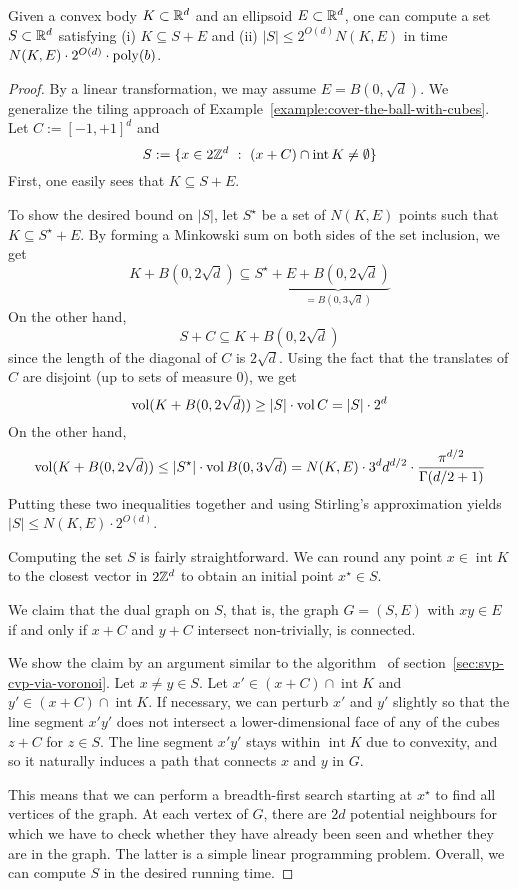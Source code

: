 \begin{lemma}
  Given a convex body $K \subset \mathbb{R}^d$ and an ellipsoid $E \subset \mathbb{R}^d$,
  one can compute a set $S \subset \mathbb{R}^d$ satisfying
  (i) $K \subseteq S + E$ and (ii) $|S| \leq 2^{O(d)} N(K,E)$
  in time $N(K,E) \cdot 2^{O(d)} \cdot \operatorname{poly}(b)$.
\end{lemma}
\begin{proof}
  By a linear transformation,
  we may assume $E = B(0,\sqrt{d})$.
  We generalize the tiling approach of Example~\ref{example:cover-the-ball-with-cubes}.
  Let $C := [-1,+1]^d$ and
  \[
    S := \{ x \in 2\mathbb{Z}^d ~:~ (x + C) \cap \operatorname{int} K \neq \emptyset \}
  \]
  First, one easily sees that $K \subseteq S + E$.

  To show the desired bound on $|S|$,
  let $S^\star$ be a set of $N(K,E)$ points
  such that $K \subseteq S^\star + E$.
  By forming a Minkowski sum on both sides of the set inclusion, we get
  \[
    K + B(0,2\sqrt{d}) \subseteq S^\star + \underbrace{E + B(0,2\sqrt{d})}_{= B(0,3\sqrt{d})}
  \]
  On the other hand,
  \[
    S + C \subseteq K + B(0,2\sqrt{d})
  \]
  since the length of the diagonal of $C$ is $2\sqrt{d}$.
  Using the fact that the translates of $C$ are disjoint (up to sets of measure $0$),
  we get
  \[
    \operatorname{vol}(K + B(0,2\sqrt{d})) \geq |S| \cdot \operatorname{vol} C = |S| \cdot 2^d
  \]
  On the other hand,
  \[
    \operatorname{vol}(K + B(0,2\sqrt{d})) \leq |S^\star| \cdot \operatorname{vol} B(0,3\sqrt{d})
    = N(K,E) \cdot 3^d d^{d/2} \cdot \frac{\pi^{d/2}}{\Gamma(d/2 + 1)}
  \]
  Putting these two inequalities together and using Stirling's approximation
  yields $|S| \leq N(K,E) \cdot 2^{O(d)}$.

  Computing the set $S$ is fairly straightforward.
  We can round any point $x \in \operatorname{int} K$ to the closest vector in $2 \mathbb{Z}^d$
  to obtain an initial point $x^\star \in S$.

  We claim that the dual graph on $S$,
  that is,
  the graph $G = (S,E)$ with $xy \in E$ if and only if $x+C$ and $y+C$ intersect non-trivially,
  is connected.

  We show the claim by an argument similar to the algorithm~
  of section~\ref{sec:svp-cvp-via-voronoi}.
  Let $x \neq y \in S$.
  Let $x' \in (x+C) \cap \operatorname{int} K$ and $y' \in (x+C) \cap \operatorname{int} K$.
  If necessary, we can perturb $x'$ and $y'$ slightly
  so that the line segment $x'y'$
  does not intersect a lower-dimensional face of any of the cubes $z + C$ for $z \in S$.
  The line segment $x'y'$ stays within $\operatorname{int} K$ due to convexity,
  and so it naturally induces a path that connects $x$ and $y$ in $G$.

  This means that we can perform a breadth-first search starting at $x^\star$ to find all vertices of the graph.
  At each vertex of $G$, there are $2d$ potential neighbours for which we have to check
  whether they have already been seen and whether they are in the graph.
  The latter is a simple linear programming problem.
  Overall, we can compute $S$ in the desired running time.
\end{proof}

